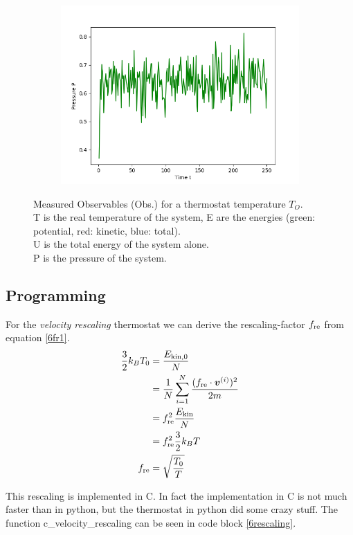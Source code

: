 \begin{figure}[ht]
\begin{subfigure}{0.3\textwidth}
\includegraphics[width=\textwidth]{../dat/Pressure_T2d0.png}
\end{subfigure}

\caption{
Measured Observables (Obs.) for a thermostat temperature $T_O$.\\
T is the real temperature of the system, E are the energies (green: potential, red: kinetic, blue: total).\\
U is the total energy of the system alone.\\
P is the pressure of the system.}
\label{fig4}
\end{figure}

\subsection*{Programming}

For the \emph{velocity rescaling} thermostat we can derive the rescaling-factor $f_\text{re}$ from equation \eqref{6fr1}.
\begin{align}
\frac{3}{2}k_BT_0
	&= \frac{E_{\text{kin},0}}{N}
	\label{6fr1}\\
&= \frac{1}{N}\sum_{i=1}^{N} \frac{(f_\text{re}\cdot\boldsymbol{v}^{(i)})^2}{2m}
	\label{6fr2}\\
&= f_\text{re}^2\frac{E_\text{kin}}{N}
	\label{6fr3}\\
&=f_\text{re}^2\frac{3}{2}k_BT
	\label{6fr4}\\
f_\text{re}
	&= \sqrt{\frac{T_0}{T}}
	\label{6r5}
\end{align}

This rescaling is implemented in C. In fact the implementation in C is not much faster than in python, but the thermostat in python did some crazy stuff.
The function c\_velocity\_rescaling can be seen in code block \ref{6rescaling}.

